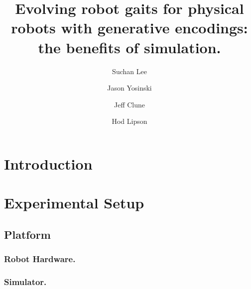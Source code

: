 \documentclass{llncs}
\begin{document}
%
\title{Evolving robot gaits for physical robots with generative encodings: the benefits of simulation.}

\author{Suchan Lee \and Jason Yosinski \and Jeff Clune \and Hod Lipson}
\maketitle
%
%
%
%
\begin{abstract}

\end{abstract}
%
%


\section{Introduction}

%
%
\section{Experimental Setup}
\subsection{Platform}
\subsubsection{Robot Hardware.}

\subsubsection{Simulator.}

\end{document}
